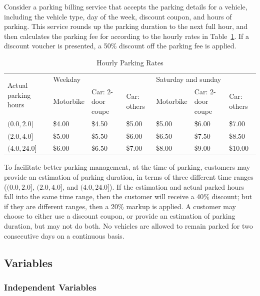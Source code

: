 \documentclass[10pt,journal,compsoc]{IEEEtran}
\begin{document}
Consider a parking billing service that accepts the parking details for a vehicle, including the vehicle type, day of the week, discount coupon, and hours of parking.
This service  rounds up the parking duration to the next full hour, and then calculates the parking fee for according to the hourly rates in Table~\ref{tab:hourlyRate}.
If a discount voucher is presented, a 50\% discount off the parking fee is applied.

\begin{table}
  \caption{Hourly Parking Rates}
  \label{tab:hourlyRate}
  \centering
  \begin{tabular}{lllllll} \toprule
  \multirow{2}{*}{Actual parking hours} &\multicolumn{3}{l}{Weekday}&\multicolumn{3}{l}{Saturday and sunday} \\ \cmidrule(lr){2-4} \cmidrule(lr){5-7}
                                  &Motorbike  &Car: 2-door coupe  &Car: others    &Motorbike  &Car: 2-door coupe  &Car: others \\ \midrule
  $(0.0,2.0]$                     &\$4.00        &\$4.50          &\$5.00      &\$5.00        &\$6.00        &\$7.00 \\
  $(2.0,4.0]$                     &\$5.00        &\$5.50          &\$6.00      &\$6.50      &\$7.50        &\$8.50  \\
  $(4.0,24.0]$                    &\$6.00        &\$6.50          &\$7.00      &\$8.00      &\$9.00        &\$10.00  \\ \bottomrule
  \end{tabular}
\end{table}

To facilitate better parking management, at the time of parking, customers may provide an estimation of parking duration, in terms of three different time ranges ($(0.0,2.0]$, $(2.0,4.0]$, and $(4.0,24.0]$).
If the estimation and actual parked hours fall into the same time range, then the customer will receive a 40\% discount;
but if they are different ranges, then a 20\% markup is applied.
A customer may choose to either use a discount coupon, or provide an estimation of parking duration, but may not do both.
No vehicles are allowed to remain parked for two consecutive days on a continuous basis.

\subsection{Variables}
\label{sec:variables}

\subsubsection{Independent Variables}
\label{sec:independentvariables}
\end{document}
